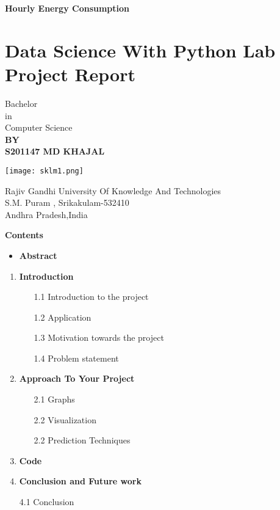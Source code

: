 \documentclass{article}
\begin{document}
\begin{center}
\Large
\textbf{\huge Hourly Energy Consumption}
\section*{
Data Science With Python Lab Project Report}
\Large
   Bachelor\\ 
     in \\
  Computer Science\\
  \vspace{1cm}
  \textbf{BY\\
  S201147 MD KHAJAL}\\
 
    \vspace{1cm}
    \begin{center}
      \texttt{[image: sklm1.png]}  
    \end{center}
Rajiv Gandhi University Of Knowledge And Technologies\\
S.M. Puram , Srikakulam-532410\\
 Andhra Pradesh,India
 \end{center}
 \newpage
 \LARGE
\textbf{Contents}
\vspace{1cm}
\large
\begin{itemize}
		\item \textbf{Abstract} \hspace{27em}
\end{itemize}
\begin{enumerate}
	\item \textbf{Introduction\hspace{22em}}
		\begin{enumerate}
				\item[1.1] Introduction to the project 
				\item[1.2] Application 
				\item[1.3] Motivation towards the project 
                    \item[1.4] Problem statement 
                    \end{enumerate}
        \item\textbf{Approach To Your Project}\hspace{27em}
        \begin{enumerate}
        \item[2.1]Graphs 
        \item[2.2]Visualization 
        \item[2.2]Prediction Techniques
             \end{enumerate}
        \item\textbf{Code} 
        \item\textbf{Conclusion and Future work}
          \item[4.1]Conclusion
\end{enumerate}
\newpage
\end{document}
